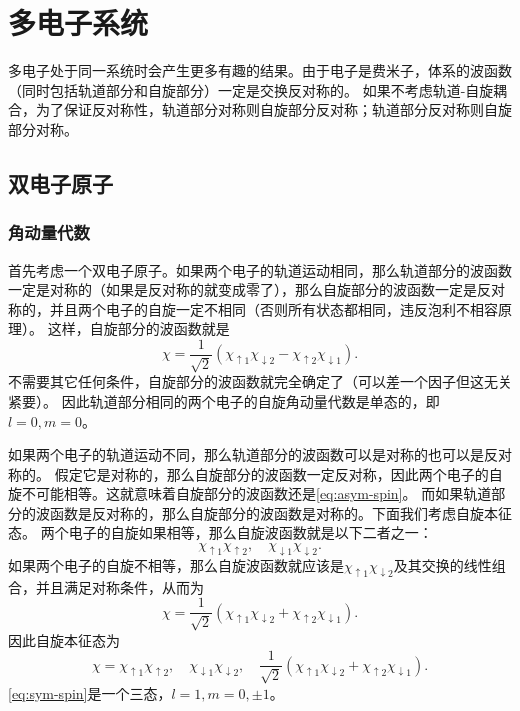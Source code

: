 \documentclass[UTF8, a4paper]{ctexart}
\begin{document}
\section{多电子系统}

多电子处于同一系统时会产生更多有趣的结果。由于电子是费米子，体系的波函数（同时包括轨道部分和自旋部分）一定是交换反对称的。
如果不考虑轨道-自旋耦合，为了保证反对称性，轨道部分对称则自旋部分反对称；轨道部分反对称则自旋部分对称。

\subsection{双电子原子}

\subsubsection{角动量代数}

首先考虑一个双电子原子。如果两个电子的轨道运动相同，那么轨道部分的波函数一定是对称的（如果是反对称的就变成零了），那么自旋部分的波函数一定是反对称的，并且两个电子的自旋一定不相同（否则所有状态都相同，违反泡利不相容原理）。
这样，自旋部分的波函数就是
\begin{equation}
    \chi = \frac{1}{\sqrt{2}} (\chi_{\uparrow 1} \chi_{\downarrow 2} - \chi_{\uparrow 2} \chi_{\downarrow 1}).
    \label{eq:asym-spin}
\end{equation}
不需要其它任何条件，自旋部分的波函数就完全确定了（可以差一个因子但这无关紧要）。
因此轨道部分相同的两个电子的自旋角动量代数是单态的，即$l=0, m=0$。

如果两个电子的轨道运动不同，那么轨道部分的波函数可以是对称的也可以是反对称的。
假定它是对称的，那么自旋部分的波函数一定反对称，因此两个电子的自旋不可能相等。这就意味着自旋部分的波函数还是\eqref{eq:asym-spin}。
而如果轨道部分的波函数是反对称的，那么自旋部分的波函数是对称的。下面我们考虑自旋本征态。
两个电子的自旋如果相等，那么自旋波函数就是以下二者之一：
\[
    \chi_{\uparrow 1} \chi_{\uparrow 2}, \quad \chi_{\downarrow 1} \chi_{\downarrow 2}.
\]
如果两个电子的自旋不相等，那么自旋波函数就应该是$\chi_{\uparrow 1} \chi_{\downarrow 2}$及其交换的线性组合，并且满足对称条件，从而为
\[
    \chi = \frac{1}{\sqrt{2}} (\chi_{\uparrow 1} \chi_{\downarrow 2} + \chi_{\uparrow 2} \chi_{\downarrow 1}).
\]
因此自旋本征态为
\begin{equation}
    \chi = \chi_{\uparrow 1} \chi_{\uparrow 2}, \quad \chi_{\downarrow 1} \chi_{\downarrow 2}, \quad \frac{1}{\sqrt{2}} (\chi_{\uparrow 1} \chi_{\downarrow 2} + \chi_{\uparrow 2} \chi_{\downarrow 1}).
    \label{eq:sym-spin}
\end{equation}
\eqref{eq:sym-spin}是一个三态，$l=1, m=0, \pm 1$。
\end{document}
